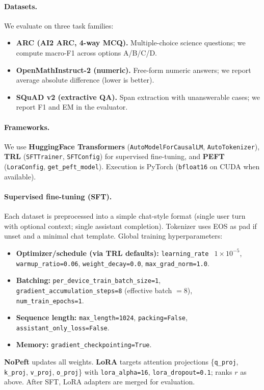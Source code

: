 \documentclass[11pt,a4paper]{article}
\begin{document}
\paragraph{Datasets.}
We evaluate on three task families:
\begin{itemize}
  \item \textbf{ARC\cite{arc} (AI2 ARC, 4-way MCQ).} Multiple-choice science questions; we compute macro-F1 across options A/B/C/D.
  \item \textbf{OpenMathInstruct-2\cite{openmath} (numeric).} Free-form numeric answers; we report average absolute difference (lower is better).
  \item \textbf{SQuAD v2\cite{squad} (extractive QA).} Span extraction with unanswerable cases; we report F1 and EM in the evaluator.
\end{itemize}

\paragraph{Frameworks.}
We use \textbf{HuggingFace Transformers}\cite{huggingfaceTransformers} (\texttt{AutoModelForCausalLM}, \texttt{AutoTokenizer}), \textbf{TRL} (\texttt{SFTTrainer}, \texttt{SFTConfig}) for supervised fine-tuning, and \textbf{PEFT} (\texttt{LoraConfig}, \texttt{get\_peft\_model}). Execution is PyTorch (\texttt{bfloat16} on CUDA when available).

\paragraph{Supervised fine-tuning (SFT).}
Each dataset is preprocessed into a simple chat-style format (single user turn with optional context; single assistant completion). Tokenizer uses EOS as pad if unset and a minimal chat template. Global training hyperparameters:
\begin{itemize}
  \item \textbf{Optimizer/schedule (via TRL defaults):} \texttt{learning\_rate $\;1\!\times\!10^{-5}$}, \texttt{warmup\_ratio=0.06}, \texttt{weight\_decay=0.0}, \texttt{max\_grad\_norm=1.0}.
  \item \textbf{Batching:} \texttt{per\_device\_train\_batch\_size=1}, \texttt{gradient\_accumulation\_steps=8} (effective batch $=8$), \texttt{num\_train\_epochs=1}.
  \item \textbf{Sequence length:} \texttt{max\_length=1024}, \texttt{packing=False}, \texttt{assistant\_only\_loss=False}.
  \item \textbf{Memory:} \texttt{gradient\_checkpointing=True}.
\end{itemize}
\textbf{NoPeft} updates all weights. \textbf{LoRA} targets attention projections \{\texttt{q\_proj}, \texttt{k\_proj}, \texttt{v\_proj}, \texttt{o\_proj}\} with \texttt{lora\_alpha=16}, \texttt{lora\_dropout=0.1}; ranks $r$ as above. After SFT, LoRA adapters are merged for evaluation.
\end{document}
